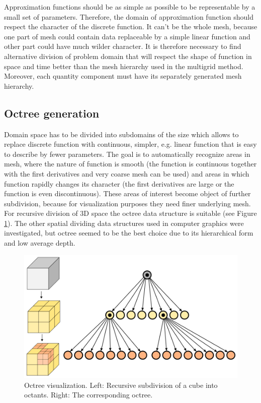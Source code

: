 Approximation functions should be as simple as possible to be representable by a small set of parameters. Therefore, the domain of approximation function should respect the character of the discrete function. It can’t be the whole mesh, because one part of mesh could contain data replaceable by a simple linear function and other part could have much wilder character. It is therefore necessary to find alternative division of problem domain that will respect the shape of function in space and time better than the mesh hierarchy used in the multigrid method. Moreover, each quantity component must have its separately generated mesh hierarchy.


\subsection{Octree generation}

Domain space has to be divided into subdomains of the size which allows to replace discrete function with continuous, simpler, e.g. linear function that is easy to describe by fewer parameters. The goal is to automatically recognize areas in mesh, where the nature of function is smooth (the function is continuous together with the first derivatives and very coarse mesh can be used) and areas in which function rapidly changes its character (the first derivatives are large or the function is even discontinuous). These areas of interest become object of further subdivision, because for visualization purposes they need finer underlying mesh. For recursive division of 3D space the octree data structure is suitable (see Figure \ref{fig:octree-visualization}). The other spatial dividing data structures used in computer graphics were investigated, but octree seemed to be the best choice due to its hierarchical form and low average depth.

\begin{figure}[H]
\centering
\includegraphics[width=\textwidth]{figures/appendix-approximation/figure1}
\decoRule
\caption[Octree visualization]{Octree visualization. Left: Recursive subdivision of a cube into octants. Right: The corresponding octree.}
\label{fig:octree-visualization}
\end{figure}

